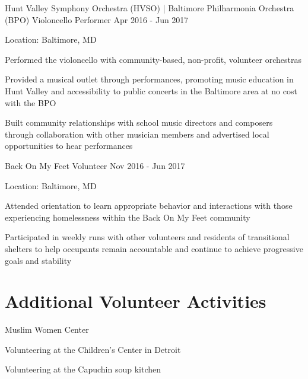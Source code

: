 \documentclass{../styles/cv}
\begin{document}
\subsectionpositiondate
    {Hunt Valley Symphony Orchestra (HVSO) | Baltimore Philharmonia Orchestra (BPO)}
    {Violoncello Performer}
    {Apr 2016 - Jun 2017}
\resumesublistbegin
    \item Location: Baltimore, MD
    \item Performed the violoncello with community-based, non-profit, volunteer orchestras
    \item Provided a musical outlet through performances, promoting music education in Hunt Valley and accessibility to public concerts in the Baltimore area at no cost with the BPO
    \item Built community relationships with school music directors and composers through collaboration with other musician members and advertised local opportunities to hear performances
\resumesublistend

\subsectionpositiondate
    {Back On My Feet}
    {Volunteer}
    {Nov 2016 - Jun 2017}
\resumesublistbegin
    \item Location: Baltimore, MD
    \item Attended orientation to learn appropriate behavior and  interactions with those experiencing homelessness within the Back On My Feet community
    \item Participated in weekly runs with other volunteers and residents of transitional shelters to help occupants remain accountable and continue to achieve progressive goals and stability
\resumesublistend

\section{Additional Volunteer Activities}
\resumesublistbegin
    \item Muslim Women Center
    \item Volunteering at the Children's Center in Detroit
    \item Volunteering at the Capuchin soup kitchen
\resumesublistend
\end{document}
